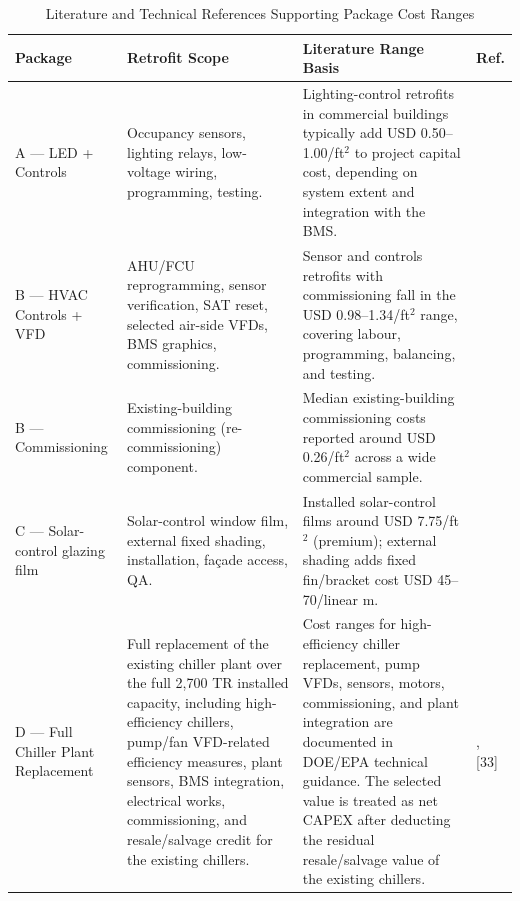 \documentclass[journal,fleqn]{IEEEtran}
\renewcommand{\arraystretch}{1.08}
\begin{document}
\begin{table}[!t]
\caption{Literature and Technical References Supporting Package Cost Ranges}
\label{tab:04}
\centering
\footnotesize
\setlength{\tabcolsep}{4pt}
\renewcommand{\arraystretch}{1.16}
\begin{tabularx}{\textwidth}{@{}>{\raggedright\arraybackslash}p{}>{\raggedright\arraybackslash}p{}>{\raggedright\arraybackslash}X>{\centering\arraybackslash}p{}@{}}
\toprule
\textbf{Package} & \textbf{Retrofit Scope} & \textbf{Literature Range Basis} & \textbf{Ref.} \\
\midrule
A --- LED + Controls & Occupancy sensors, lighting relays, low-voltage wiring, programming, testing. & Lighting-control retrofits in commercial buildings typically add USD 0.50--1.00/ft$^{2}$ to project capital cost, depending on system extent and integration with the BMS. & [28] \\
B --- HVAC Controls + VFD & AHU/FCU reprogramming, sensor verification, SAT reset, selected air-side VFDs, BMS graphics, commissioning. & Sensor and controls retrofits with commissioning fall in the USD 0.98--1.34/ft$^{2}$ range, covering labour, programming, balancing, and testing. & [29] \\
B --- Commissioning & Existing-building commissioning (re-commissioning) component. & Median existing-building commissioning costs reported around USD 0.26/ft$^{2}$ across a wide commercial sample. & [30] \\
C --- Solar-control glazing film & Solar-control window film, external fixed shading, installation, façade access, QA. & Installed solar-control films around USD 7.75/ft$^{2}$ (premium); external shading adds fixed fin/bracket cost USD 45--70/linear m. & [31] \\
D --- Full Chiller Plant Replacement & Full replacement of the existing chiller plant over the full 2,700 TR installed capacity, including high-efficiency chillers, pump/fan VFD-related efficiency measures, plant sensors, BMS integration, electrical works, commissioning, and resale/salvage credit for the existing chillers. & Cost ranges for high-efficiency chiller replacement, pump VFDs, sensors, motors, commissioning, and plant integration are documented in DOE/EPA technical guidance. The selected value is treated as net CAPEX after deducting the residual resale/salvage value of the existing chillers. & [32], [33] \\
\bottomrule
\end{tabularx}
\end{table}
\end{document}
